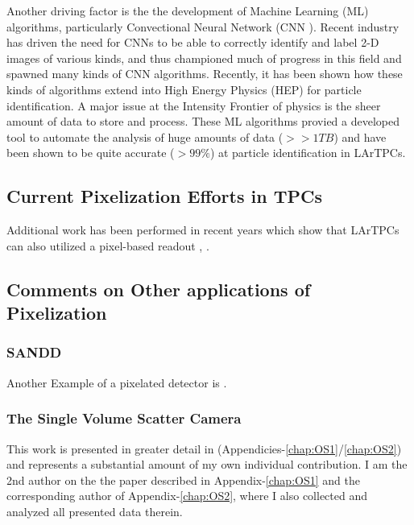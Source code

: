 \citep{Sadowski_2017}
Another driving factor is the the development of Machine Learning (ML) algorithms, particularly Convectional Neural Network (CNN \citep{Sadowski2017DeepLI}). 
Recent industry has driven the need for CNNs to be able to correctly identify and label 2-D images of various kinds, and thus championed much of progress in this field and spawned many kinds of CNN algorithms. 
Recently, it has been shown how these kinds of algorithms extend into High Energy Physics (HEP) for particle identification.
A major issue at the Intensity Frontier of physics is the sheer amount of data to store and process. 
These ML algorithms provied a developed tool to automate the analysis of huge amounts of data ($>> 1 TB$) and have been shown to be quite accurate ($>99\%$) at particle identification in LArTPCs.

\subsection{Current Pixelization Efforts in TPCs}



Additional work has been performed in recent years which show that LArTPCs can also utilized a pixel-based readout \citep{larpix:Dwyer_2018}, \citep{Asaadi_2018}.

\subsection{Comments on Other applications of Pixelization}

\subsubsection{SANDD}

Another Example of a pixelated detector is \citep{SUTANTO2021_sandd_165409}.


\subsubsection{The Single Volume Scatter Camera}

This work is presented in greater detail in (Appendicies-\ref{chap:OS1}/\ref{chap:OS2}) and represents a substantial amount of my own individual contribution. 
I am the 2nd author on the the paper described in Appendix-\ref{chap:OS1} and the corresponding author of Appendix-\ref{chap:OS2}, where I also collected and analyzed all presented data therein.